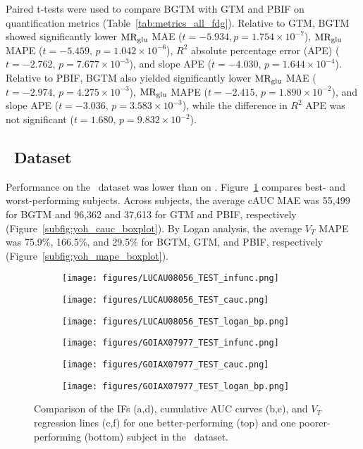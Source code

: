 Paired t-tests were used to compare BGTM with GTM and PBIF on quantification metrics (Table~\ref{tab:metrics_all_fdg}).
Relative to GTM, BGTM showed significantly lower \(\text{MR}_{\text{glu}}\) MAE (\(t=-5.934, p=1.754\times 10^{-7}\)), \(\text{MR}_{\text{glu}}\) MAPE (\(t=-5.459,\,p=1.042\times 10^{-6}\)), \(R^2\) absolute percentage error (APE) (\(t=-2.762,\,p=7.677\times 10^{-3}\)), and slope APE (\(t=-4.030,\,p=1.644\times 10^{-4}\)).
Relative to PBIF, BGTM also yielded significantly lower \(\text{MR}_{\text{glu}}\) MAE (\(t=-2.974,\,p=4.275\times 10^{-3}\)), \(\text{MR}_{\text{glu}}\) MAPE (\(t=-2.415,\,p=1.890\times 10^{-2}\)), and slope APE (\(t=-3.036,\,p=3.583\times 10^{-3}\)), while the difference in \(R^2\) APE was not significant (\(t=1.680,\,p=9.832\times 10^{-2}\)).

\subsection{\yohimbine\ Dataset}
Performance on the \yohimbine\ dataset was lower than on \fdg.
Figure~\ref{fig:yoh_ifs} compares best- and worst-performing subjects.
Across subjects, the average cAUC MAE was 55{,}499 for BGTM and 96{,}362 and 37{,}613 for GTM and PBIF, respectively (Figure~\ref{subfig:yoh_cauc_boxplot}).
By Logan analysis, the average \(V_T\) MAPE was 75.9\%, 166.5\%, and 29.5\% for BGTM, GTM, and PBIF, respectively (Figure~\ref{subfig:yoh_mape_boxplot}).

\begin{figure}[h]
	\centering
	\begin{subfigure}[b]{0.322\textwidth}
		\texttt{[image: figures/LUCAU08056\_TEST\_infunc.png]}
		\caption{}
	\end{subfigure}
	\begin{subfigure}[b]{0.322\textwidth}
		\texttt{[image: figures/LUCAU08056\_TEST\_cauc.png]}
		\caption{}
	\end{subfigure}
	\begin{subfigure}[b]{0.322\textwidth}
		\texttt{[image: figures/LUCAU08056\_TEST\_logan\_bp.png]}
		\caption{}
	\end{subfigure}
	\begin{subfigure}[b]{0.322\textwidth}
		\texttt{[image: figures/GOIAX07977\_TEST\_infunc.png]}
		\caption{}
	\end{subfigure}
	\begin{subfigure}[b]{0.322\textwidth}
		\texttt{[image: figures/GOIAX07977\_TEST\_cauc.png]}
		\caption{}
	\end{subfigure}
	\begin{subfigure}[b]{0.322\textwidth}
		\texttt{[image: figures/GOIAX07977\_TEST\_logan\_bp.png]}
		\caption{}
	\end{subfigure}
	\caption{Comparison of the IFs (a,d), cumulative AUC curves (b,e), and \(V_T\) regression lines (c,f) for one better-performing (top) and one poorer-performing (bottom) subject in the \yohimbine\ dataset.}
	\label{fig:yoh_ifs}
\end{figure}


